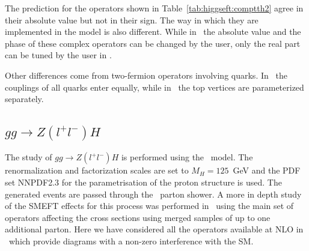 \begin{center}
  \begin{table}[h!]
    \caption{ Comparison of the SM and interference predicitions for the ttH process between the \SMEFTsim\ and \SMEFTatNLO\ for \ctB\ (\cuBAbs) and \ctW\ (\cuWAbs). The operator definition are given in the way they are implemented in \SMEFTatNLO\ .}
    \label{tab:higgseft:comptth2}
\end{table}
\end{center}

The prediction for the operators shown in Table~\ref{tab:higgseft:comptth2} agree in their absolute value but not in their sign. The way in which they are implemented in the model is also different. While in \SMEFTsim\ the absolute value and the phase of these complex operators can be changed by the user, only the real part can be tuned by the user in \SMEFTatNLO.

Other differences come from two-fermion operators involving quarks. In \SMEFTsim\ the couplings of all quarks enter equally, while in \SMEFTatNLO\ the top vertices are parameterized separately. 


\subsection{$gg\to Z(l^{+}l^{-})H$}
\label{sec:higgseft:ggzh}
The study of  $gg\to Z(l^{+}l^{-})H$ is performed using the \SMEFTatNLO\ model. The renormalization and factorization scales are set to $M_H=125$~GeV and the PDF set NNPDF2.3 for the parametrisation of the proton structure is used. The generated events are passed through the \Pythia\ parton shower. A more in depth study of the SMEFT effects for this process was performed in~\cite{Bylund:2016phk} using the main set of operators affecting the cross sections using merged samples of up to one additional parton. Here we have considered all the operators available at NLO in \SMEFTatNLO\ which provide diagrams with a non-zero interference with the SM.

